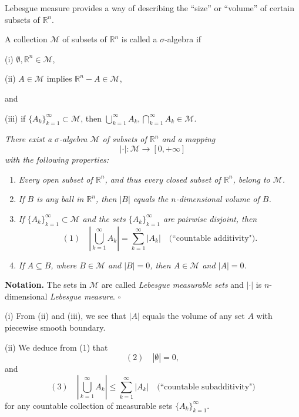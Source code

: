 Lebesgue measure provides a way of describing the ``size'' or ``volume'' of certain subsets of $\mathbb{R}^n$.

\begin{definition}
\label{def:sigma-algebra}
A collection $\mathcal{M}$ of subsets of $\mathbb{R}^n$ is called a $\sigma$-algebra if

(i) $\emptyset, \mathbb{R}^n \in \mathcal{M}$,

(ii) $A \in \mathcal{M}$ implies $\mathbb{R}^n - A \in \mathcal{M}$,

and

(iii) if $\{A_k\}_{k=1}^{\infty} \subset \mathcal{M}$, then $\bigcup_{k=1}^{\infty} A_k, \bigcap_{k=1}^{\infty} A_k \in \mathcal{M}$.
\end{definition}

\begin{theorem}
\label{thm:existence-lebesgue-measure}
\textit{There exist a $\sigma$-algebra $\mathcal{M}$ of subsets of $\mathbb{R}^n$ and a mapping}
$$| \cdot | : \mathcal{M} \to [0, +\infty]$$
\textit{with the following properties:}

\begin{enumerate}
\item[(i)] \textit{Every open subset of $\mathbb{R}^n$, and thus every closed subset of $\mathbb{R}^n$, belong to $\mathcal{M}$.}
\item[(ii)] \textit{If $B$ is any ball in $\mathbb{R}^n$, then $|B|$ equals the $n$-dimensional volume of $B$.}
\item[(iii)] \textit{If $\{A_k\}_{k=1}^{\infty} \subset \mathcal{M}$ and the sets $\{A_k\}_{k=1}^{\infty}$ are pairwise disjoint, then}
$$(1) \quad \left| \bigcup_{k=1}^{\infty} A_k \right| = \sum_{k=1}^{\infty} |A_k| \quad \text{(``countable additivity")}.$$
\item[(iv)] \textit{If $A \subseteq B$, where $B \in \mathcal{M}$ and $|B| = 0$, then $A \in \mathcal{M}$ and $|A| = 0$.}
\end{enumerate}

\textbf{Notation.} The sets in $\mathcal{M}$ are called \textit{Lebesgue measurable sets} and $| \cdot |$ is $n$-dimensional \textit{Lebesgue measure}. $\square$
\end{theorem}

\begin{remark}
\label{rem:lebesgue-measure-properties}
(i) From (ii) and (iii), we see that $|A|$ equals the volume of any set $A$ with piecewise smooth boundary.

(ii) We deduce from (1) that
$$(2) \quad |\emptyset| = 0,$$
and
$$(3) \quad \left| \bigcup_{k=1}^{\infty} A_k \right| \leq \sum_{k=1}^{\infty} |A_k| \quad \text{(``countable subadditivity")}$$
for any countable collection of measurable sets $\{A_k\}_{k=1}^{\infty}$.
\end{remark}

